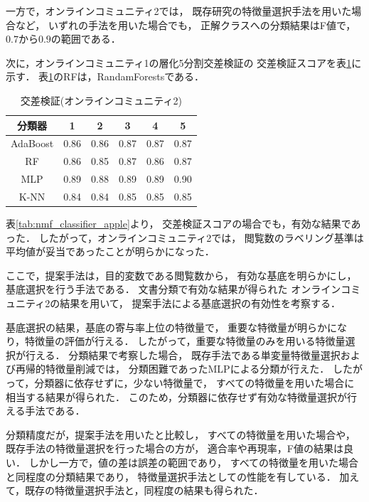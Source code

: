 \documentclass[12pt,a4paper,twocolumn,twoside]{jsik}
\begin{document}
\newpage
一方で，オンラインコミュニティ2では，
既存研究の特徴量選択手法を用いた場合など，
いずれの手法を用いた場合でも，
正解クラスへの分類結果はF値で，
$0.7$から$0.9$の範囲である．

次に，オンラインコミュニティ1の層化5分割交差検証の
交差検証スコアを表\ref{tab:nmf_classifier_stackoverflow}に示す．
表\ref{tab:nmf_classifier_stackoverflow}のRFは，RandamForestsである．
%
\begin{table}[htb]
  \caption{交差検証(オンラインコミュニティ2)} 
  \label{tab:nmf_classifier_stackoverflow}
  \begin{center}
  \begin{tabular}{c|c|c|c|c|c} \hline
    分類器 & 1 & 2 & 3 & 4 & 5 \\ \hline \hline
    AdaBoost & 0.86 & 0.86 & 0.87 & 0.87 & 0.87 \\ \hline 
    RF & 0.86 & 0.85 & 0.87 & 0.86 & 0.87 \\ \hline 
    MLP & 0.89 & 0.88 & 0.89 & 0.89 & 0.90 \\ \hline 
    K-NN & 0.84 & 0.84 & 0.85 & 0.85 & 0.85 \\ \hline
  \end{tabular}
  \end{center}
\end{table}

表\ref{tab:nmf_classifier_apple}より，
交差検証スコアの場合でも，有効な結果であった．
したがって，オンラインコミュニティ2では，
閲覧数のラベリング基準は平均値が妥当であったことが明らかになった．

ここで，提案手法は，目的変数である閲覧数から，
有効な基底を明らかにし，基底選択を行う手法である．
%
文書分類で有効な結果が得られた
オンラインコミュニティ2の結果を用いて，
提案手法による基底選択の有効性を考察する．

基底選択の結果，基底の寄与率上位の特徴量で，
重要な特徴量が明らかになり，特徴量の評価が行える．
したがって，重要な特徴量のみを用いる特徴量選択が行える．
%
分類結果で考察した場合，
既存手法である単変量特徴量選択および再帰的特徴量削減では，
分類困難であったMLPによる分類が行えた．
%
したがって，分類器に依存せずに，少ない特徴量で，
すべての特徴量を用いた場合に相当する結果が得られた．
このため，分類器に依存せず有効な特徴量選択が行える手法である．

分類精度だが，提案手法を用いたと比較し，
すべての特徴量を用いた場合や，
既存手法の特徴量選択を行った場合の方が，
適合率や再現率，F値の結果は良い．
%
しかし一方で，値の差は誤差の範囲であり，
すべての特徴量を用いた場合と同程度の分類結果であり，
特徴量選択手法としての性能を有している．
加えて，既存の特徴量選択手法と，同程度の結果も得られた．
\end{document}
